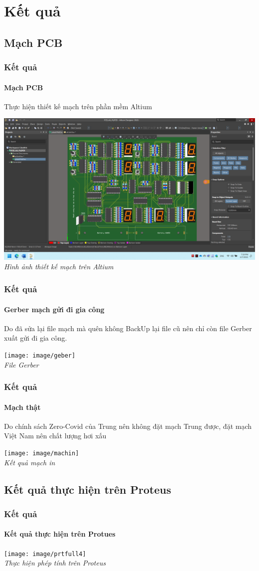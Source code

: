 \documentclass[12pt,a4paper]{beamer}
\begin{document}
\section{Kết quả}
\subsection{Mạch PCB}
\begin{frame}
	
	\frametitle{Kết quả}
	\framesubtitle{Mạch PCB}
	
	Thực hiện thiết kế mạch trên phần mềm Altium
	\begin{center}
		\includegraphics[width=0.8\linewidth]{img_all}\\
		\textit{{Hình ảnh thiết kế mạch trên Altium}}
	\end{center}
\end{frame}

\begin{frame}
	\frametitle{Kết quả}
	\framesubtitle{Gerber mạch gửi đi gia công}
	Do đã sửa lại file mạch mà quên không BackUp lại file cũ nên chỉ còn file Gerber xuất gửi đi gia công.
	\begin{center}
		\texttt{[image: image/geber]}\\
		\textit{File Gerber}
	\end{center}
\end{frame}

\begin{frame}
	\frametitle{Kết quả}
	\framesubtitle{Mạch thật}
	Do chính sách Zero-Covid của Trung nên không đặt mạch Trung được, đặt mạch Việt Nam nên chất lượng hơi xấu
	\begin{center}
		\texttt{[image: image/machin]}\\
		\textit{Kết quả mạch in}
	\end{center}
\end{frame}

\subsection{Kết quả thực hiện trên Proteus}
\begin{frame}
	\frametitle{Kết quả}
	\framesubtitle{Kết quả thực hiện trên Protues}
	
	\begin{center}
		\texttt{[image: image/prtfull4]}\\
		\textit{Thực hiện phép tính trên Proteus}
	\end{center}
\end{frame}
\end{document}
